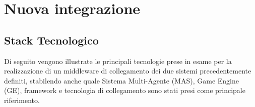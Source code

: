 \chapter{Nuova integrazione}



\section{Stack Tecnologico}

Di seguito vengono illustrate le principali tecnologie prese in esame per la realizzazione di un middleware di collegamento dei due sistemi precedentemente definiti, stabilendo anche quale Sistema Multi-Agente (MAS), Game Engine (GE), framework e tecnologia di collegamento sono stati presi come principale riferimento.







